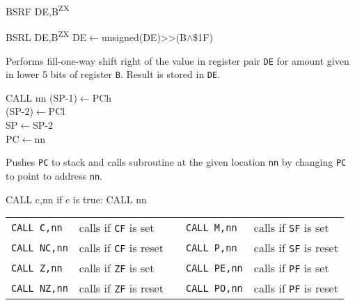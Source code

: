 \documentclass[twoside,openright,a4paper]{book}
\newcommand{\ZXN}{\textnormal{\textsuperscript{ZX}}}
\begin{document}
\begin{basedescript}{
	\desclabelstyle{\multilinelabel}
	\desclabelwidth{3cm}}
\begin{detailitem}{BSRF DE,B\ZXN}
		\DetailNoEffect
		
		\begin{DetailTiming}
		\end{DetailTiming}

	\end{detailitem}

	\pagebreak	%

	\begin{detailitem}{BSRL DE,B\ZXN}
		{DE$\leftarrow$unsigned(DE)>>(B$\wedge$\$1F)}

		Performs fill-one-way shift right of the value in register pair {\tt DE} for amount given in lower 5 bits of register {\tt B}. Result is stored in {\tt DE}.

		\DetailNoEffect
		
		\begin{DetailTiming}
			\DetailTime{}{2}{8}
		\end{DetailTiming}

	\end{detailitem}
	
	\begin{detailitem}{CALL nn}
		{(SP-1)$\leftarrow$PCh\\
		(SP-2)$\leftarrow$PCl\\
		SP$\leftarrow$SP-2\\
		PC$\leftarrow$nn}

		Pushes {\tt PC} to stack and calls subroutine at the given location {\tt nn} by changing {\tt PC} to point to address {\tt nn}.

		\DetailNoEffect
		
		\begin{DetailTiming}
			\DetailTime{}{5}{17}
		\end{DetailTiming}

	\end{detailitem}

	\begin{detailitem}{CALL c,nn}
		{if c is true: CALL nn}

		\vspace{1ex} %
		\begin{tabular}{@{}llcll}			
			{\tt CALL C,nn} & calls if {\tt CF} is set & &
				{\tt CALL M,nn} & calls if {\tt SF} is set\\
			{\tt CALL NC,nn} & calls if {\tt CF} is reset & &
				{\tt CALL P,nn} & calls if {\tt SF} is reset\\
			{\tt CALL Z,nn} & calls if {\tt ZF} is set & &
				{\tt CALL PE,nn} & calls if {\tt PF} is set\\
			{\tt CALL NZ,nn} & calls if {\tt ZF} is reset & &
				{\tt CALL PO,nn} & calls if {\tt PF} is reset\\
		\end{tabular}


\end{detailitem}
\end{basedescript}
\end{document}
